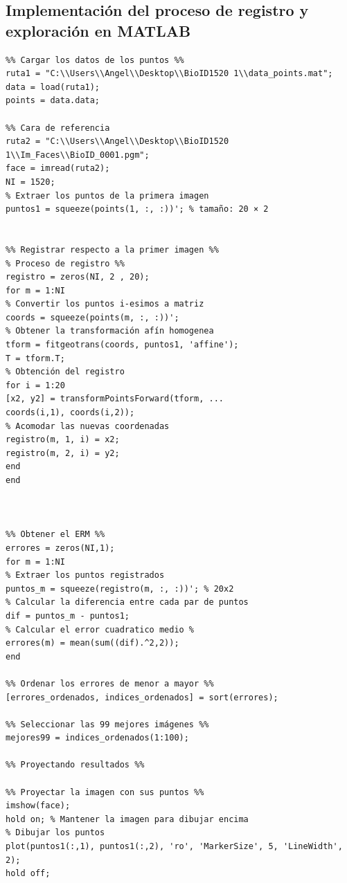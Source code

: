 \documentclass[11pt, letterpaper]{article}
\begin{document}
\subsection{Implementación del proceso de registro y exploración en MATLAB}
\begin{verbatim}
%% Cargar los datos de los puntos %%
ruta1 = "C:\\Users\\Angel\\Desktop\\BioID1520 1\\data_points.mat";
data = load(ruta1);
points = data.data;

%% Cara de referencia 
ruta2 = "C:\\Users\\Angel\\Desktop\\BioID1520 1\\Im_Faces\\BioID_0001.pgm";
face = imread(ruta2);
NI = 1520;
% Extraer los puntos de la primera imagen
puntos1 = squeeze(points(1, :, :))'; % tamaño: 20 × 2


%% Registrar respecto a la primer imagen %%
% Proceso de registro %%
registro = zeros(NI, 2 , 20);
for m = 1:NI    
% Convertir los puntos i-esimos a matriz
coords = squeeze(points(m, :, :))';    
% Obtener la transformación afín homogenea
tform = fitgeotrans(coords, puntos1, 'affine');
T = tform.T;
% Obtención del registro
for i = 1:20
[x2, y2] = transformPointsForward(tform, ...
coords(i,1), coords(i,2));
% Acomodar las nuevas coordenadas 
registro(m, 1, i) = x2;
registro(m, 2, i) = y2;
end
end



%% Obtener el ERM %%
errores = zeros(NI,1);
for m = 1:NI
% Extraer los puntos registrados 
puntos_m = squeeze(registro(m, :, :))'; % 20x2
% Calcular la diferencia entre cada par de puntos
dif = puntos_m - puntos1;
% Calcular el error cuadratico medio %
errores(m) = mean(sum((dif).^2,2));
end

%% Ordenar los errores de menor a mayor %%
[errores_ordenados, indices_ordenados] = sort(errores);

%% Seleccionar las 99 mejores imágenes %%
mejores99 = indices_ordenados(1:100);

%% Proyectando resultados %%

%% Proyectar la imagen con sus puntos %%
imshow(face);
hold on; % Mantener la imagen para dibujar encima
% Dibujar los puntos
plot(puntos1(:,1), puntos1(:,2), 'ro', 'MarkerSize', 5, 'LineWidth', 2);
hold off;


\end{verbatim}
\end{document}

